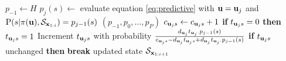 {\begin{algorithm}
\begin{algorithmic}[1]
    \State $p_{-1} \gets H$
    \State $p_j(s) \gets$ evaluate equation \eqref{eq:predictive} with
    $\ubf = \ubf_j$ and $\Prob(s|\parent(\ubf),\statei) = p_{j-1}(s)$
    \EndFor
    \EndFor
    \State \Return $(p_{-1}, p_0, \ldots, p_P)$
    \EndFunction
     
    \State $c_{\ubf_j s} \gets c_{\ubf_j s} + 1$
    \State \textbf{if} $t_{\ubf_j s} = 0$ \textbf{then} $t_{\ubf_j s} = 1$
    \State Increment $t_{\ubf_j s}$ with probability
    $\frac{d_{\ubf_j}t_{\ubf_j \cdot} p_{j-1}(s)}{c_{\ubf_j s} - d_{\ubf_j}
    t_{\ubf_j s} +
    d_{\ubf_j}t_{\ubf_j \cdot} p_{j-1}(s) }$
    \EndIf
    \State \textbf{if} $t_{\ubf_j s}$ unchanged \textbf{then} \textbf{break}
    \EndFor
    \State \Return updated state $\mathcal{S}_{\xbf_{1:i+1}}$
    \EndFunction
\end{algorithmic}
\label{alg:update}
\end{algorithm}
}
